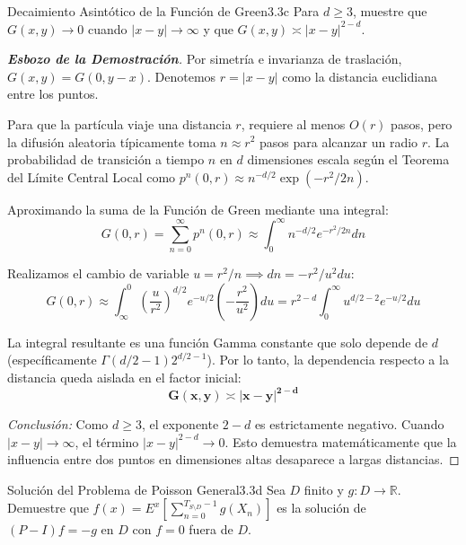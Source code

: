 \documentclass[10pt,a4paper]{article}
\begin{document}
\newpage

\begin{ejercicio}{Decaimiento Asintótico de la Función de Green}{3.3c}
    Para $d \ge 3$, muestre que $G(x,y) \to 0$ cuando $|x - y| \to \infty$ y que $G(x,y) \asymp |x - y|^{2-d}$.
\end{ejercicio}

\begin{proof}[\textbf{Esbozo de la Demostración}]
    Por simetría e invarianza de traslación, $G(x,y) = G(0, y-x)$. Denotemos $r = |x-y|$ como la distancia euclidiana entre los puntos.
    
    Para que la partícula viaje una distancia $r$, requiere al menos $O(r)$ pasos, pero la difusión aleatoria típicamente toma $n \approx r^2$ pasos para alcanzar un radio $r$.
    La probabilidad de transición a tiempo $n$ en $d$ dimensiones escala según el Teorema del Límite Central Local como $p^n(0, r) \approx n^{-d/2} \exp(-r^2/2n)$.
    
    Aproximando la suma de la Función de Green mediante una integral:
    \[ G(0, r) = \sum_{n=0}^\infty p^n(0, r) \approx \int_0^\infty n^{-d/2} e^{-r^2/2n} dn \]
    
    Realizamos el cambio de variable $u = r^2 / n \implies dn = -r^2 / u^2 du$:
    \[ G(0, r) \approx \int_\infty^0 \left(\frac{u}{r^2}\right)^{d/2} e^{-u/2} \left(-\frac{r^2}{u^2}\right) du = r^{2-d} \int_0^\infty u^{d/2 - 2} e^{-u/2} du \]
    
    La integral resultante es una función Gamma constante que solo depende de $d$ (específicamente $\Gamma(d/2 - 1) 2^{d/2-1}$). 
    Por lo tanto, la dependencia respecto a la distancia queda aislada en el factor inicial:
    \[ \mathbf{G(x,y) \asymp |x - y|^{2-d}} \]
    
    \textit{Conclusión:} Como $d \ge 3$, el exponente $2-d$ es estrictamente negativo. Cuando $|x-y| \to \infty$, el término $|x-y|^{2-d} \to 0$. Esto demuestra matemáticamente que la influencia entre dos puntos en dimensiones altas desaparece a largas distancias.
\end{proof}

\newpage

\begin{ejercicio}{Solución del Problema de Poisson General}{3.3d}
    Sea $D$ finito y $g : D \to \mathbb{R}$. Demuestre que $f(x) = E^x\left[\sum_{n=0}^{T_{S \setminus D} - 1} g(X_n)\right]$ es la solución de $(P - I)f = -g$ en $D$ con $f = 0$ fuera de $D$.
\end{ejercicio}
\end{document}
